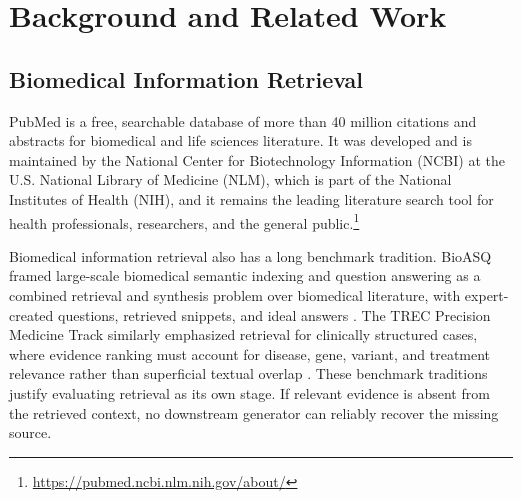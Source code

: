 \chapter{Background and Related Work}

\section{Biomedical Information Retrieval}

PubMed is a free, searchable database of more than 40 million citations and abstracts for biomedical and life sciences literature. It was developed and is maintained by the National Center for Biotechnology Information (NCBI) at the U.S. National Library of Medicine (NLM), which is part of the National Institutes of Health (NIH), and it remains the leading literature search tool for health professionals, researchers, and the general public.\footnote{\url{https://pubmed.ncbi.nlm.nih.gov/about/}}

Biomedical information retrieval also has a long benchmark tradition. BioASQ framed large-scale biomedical semantic indexing and question answering as a combined retrieval and synthesis problem over biomedical literature, with expert-created questions, retrieved snippets, and ideal answers \cite{tsatsaronis2015bioasq}. The TREC Precision Medicine Track similarly emphasized retrieval for clinically structured cases, where evidence ranking must account for disease, gene, variant, and treatment relevance rather than superficial textual overlap \cite{roberts2020trecpm}. These benchmark traditions justify evaluating retrieval as its own stage. If relevant evidence is absent from the retrieved context, no downstream generator can reliably recover the missing source.

